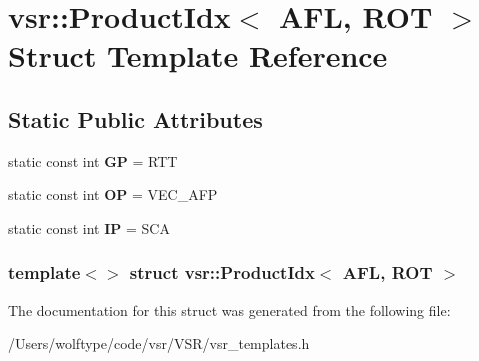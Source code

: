 \hypertarget{structvsr_1_1_product_idx_3_01_a_f_l_00_01_r_o_t_01_4}{\section{vsr\-:\-:Product\-Idx$<$ A\-F\-L, R\-O\-T $>$ Struct Template Reference}
\label{structvsr_1_1_product_idx_3_01_a_f_l_00_01_r_o_t_01_4}
}
\subsection*{Static Public Attributes}
\begin{DoxyCompactItemize}
\item 
\hypertarget{structvsr_1_1_product_idx_3_01_a_f_l_00_01_r_o_t_01_4_a104fcef08d8334b81debb6098c4dc0a7}{static const int {\bfseries G\-P} = R\-T\-T}\label{structvsr_1_1_product_idx_3_01_a_f_l_00_01_r_o_t_01_4_a104fcef08d8334b81debb6098c4dc0a7}

\item 
\hypertarget{structvsr_1_1_product_idx_3_01_a_f_l_00_01_r_o_t_01_4_ad184d0cba3f6c4b276819448200240c7}{static const int {\bfseries O\-P} = V\-E\-C\-\_\-\-A\-F\-P}\label{structvsr_1_1_product_idx_3_01_a_f_l_00_01_r_o_t_01_4_ad184d0cba3f6c4b276819448200240c7}

\item 
\hypertarget{structvsr_1_1_product_idx_3_01_a_f_l_00_01_r_o_t_01_4_a648380c6cbc4ea1d9729cc85ca492d98}{static const int {\bfseries I\-P} = S\-C\-A}\label{structvsr_1_1_product_idx_3_01_a_f_l_00_01_r_o_t_01_4_a648380c6cbc4ea1d9729cc85ca492d98}

\end{DoxyCompactItemize}
\subsubsection*{template$<$$>$ struct vsr\-::\-Product\-Idx$<$ A\-F\-L, R\-O\-T $>$}



The documentation for this struct was generated from the following file\-:\begin{DoxyCompactItemize}
\item 
/\-Users/wolftype/code/vsr/\-V\-S\-R/vsr\-\_\-templates.\-h\end{DoxyCompactItemize}
